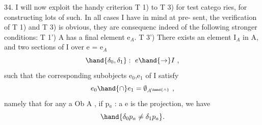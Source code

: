 34.    I will now exploit the handy criterion  T 1) to T 3) for test catego%
ries, for constructing lots of such.  In all cases I have in mind at pre-%
sent,  the verification of  T 1) and T 3) is obvious,  they are consequenc
indeed of the following stronger conditions:
T 1')  A has a final element e$_{A}$.
T 3')  There exists an element I$_{A}$ in A, and two sections  of I over
e = e$_{A}$
\[ \hand{\delta_0,\delta_1} :\ e \hand{\to} I \ , \]
such that the corresponding subobjects e$_0$,e$_1$ of I satisfy 
\[ e_0\hand{\cap}e_1 = \emptyset_{A^{\hand{\wedge}}} \ , \]
namely that for any a \hand{$\in$}Ob A , if p$_{a}$ : a \hand{$\to$}e is the projection, we
have
\[ \hand{\delta_0 p_a \neq \delta_1 p_a} . \]
